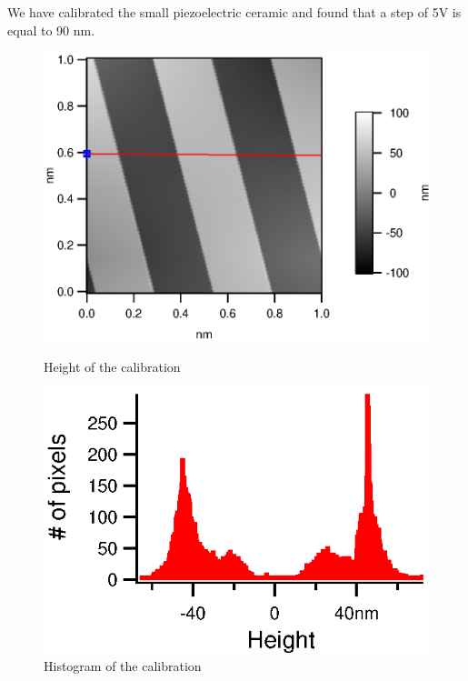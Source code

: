 We have calibrated the small piezoelectric ceramic and found that a step of 5V is equal to 90 nm.
\begin{figure}[ht]
\begin{minipage}[b]{0.45\linewidth}
\centering
\includegraphics[width=\textwidth]{images/Calib1vPP_HeightMap.eps}
\caption{Height of the calibration}
\label{fig:figure1}
\end{minipage}
\hspace{0.5cm}
\begin{minipage}[b]{0.45\linewidth}
\centering
\includegraphics[width=\textwidth]{images/Calib1VppHisto.eps}
\caption{Histogram of the calibration}
\label{fig:figure2}
\end{minipage}
\end{figure}

